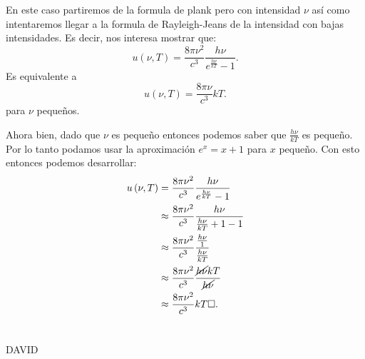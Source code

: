 \documentclass{report}
\begin{document}
\section{}

\section{}

En este caso partiremos de la formula de plank pero con intensidad $\nu$ así como intentaremos llegar a la formula de Rayleigh-Jeans de la intensidad con bajas intensidades. Es decir, nos interesa mostrar que: \[
u\left( \nu, T \right) = \frac{8\pi \nu^2}{c^3} \frac{h\nu}{e^{\frac{h\nu}{kT}} - 1}
.\] Es equivalente a \[
u\left( \nu, T \right) = \frac{8\pi \nu}{c^{3}}kT
.\] para $\nu$ pequeños.

Ahora bien, dado que $\nu$ es pequeño entonces podemos saber que $\frac{h\nu}{kT}$ es pequeño. Por lo tanto podamos usar la aproximación $e^{x} = x + 1$ para $x$ pequeño. Con esto entonces podemos desarrollar:
\begin{align*}
  u\left( \nu,T \right) &= \frac{8\pi \nu^2}{c^{3}} \frac{h\nu}{e^{\frac{h\nu}{kT}}- 1} \\
			&\approx \frac{8\pi \nu^2}{c^3} \frac{h\nu}{\frac{h\nu}{kT} + 1 - 1}\\
			&\approx \frac{8\pi \nu^2}{c^{3}}\frac{\frac{h\nu}{1}}{\frac{h\nu}{kT}}\\
			&\approx \frac{8\pi \nu^2}{c^{3}}\frac{\cancel{h\nu} kT}{\cancel{h\nu}}\\
			&\approx \frac{8\pi \nu^2}{c^{3}}kT \square
.\end{align*}

\section{}

DAVID

\section{}
\end{document}
